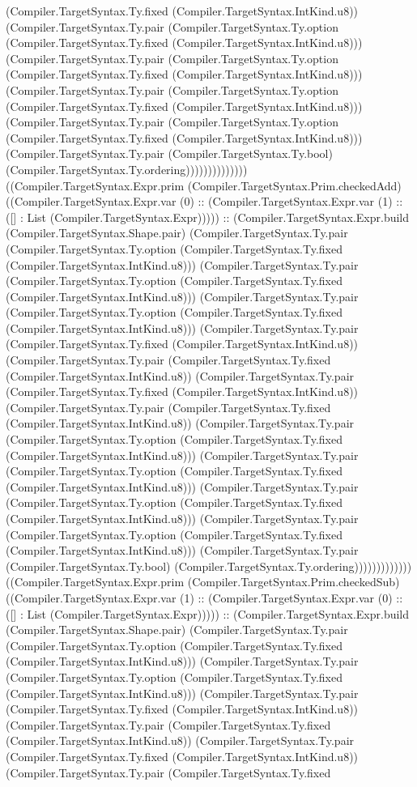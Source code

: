 \documentclass[11pt]{article}
\begin{document}
(Compiler.TargetSyntax.Ty.fixed (Compiler.TargetSyntax.IntKind.u8)) (Compiler.TargetSyntax.Ty.pair (Compiler.TargetSyntax.Ty.option (Compiler.TargetSyntax.Ty.fixed (Compiler.TargetSyntax.IntKind.u8))) (Compiler.TargetSyntax.Ty.pair (Compiler.TargetSyntax.Ty.option (Compiler.TargetSyntax.Ty.fixed (Compiler.TargetSyntax.IntKind.u8))) (Compiler.TargetSyntax.Ty.pair (Compiler.TargetSyntax.Ty.option (Compiler.TargetSyntax.Ty.fixed (Compiler.TargetSyntax.IntKind.u8))) (Compiler.TargetSyntax.Ty.pair (Compiler.TargetSyntax.Ty.option (Compiler.TargetSyntax.Ty.fixed (Compiler.TargetSyntax.IntKind.u8))) (Compiler.TargetSyntax.Ty.pair (Compiler.TargetSyntax.Ty.bool) (Compiler.TargetSyntax.Ty.ordering)))))))))))))) ((Compiler.TargetSyntax.Expr.prim (Compiler.TargetSyntax.Prim.checkedAdd) ((Compiler.TargetSyntax.Expr.var (0) :: (Compiler.TargetSyntax.Expr.var (1) :: ([] : List (Compiler.TargetSyntax.Expr))))) :: (Compiler.TargetSyntax.Expr.build (Compiler.TargetSyntax.Shape.pair) (Compiler.TargetSyntax.Ty.pair (Compiler.TargetSyntax.Ty.option (Compiler.TargetSyntax.Ty.fixed (Compiler.TargetSyntax.IntKind.u8))) (Compiler.TargetSyntax.Ty.pair (Compiler.TargetSyntax.Ty.option (Compiler.TargetSyntax.Ty.fixed (Compiler.TargetSyntax.IntKind.u8))) (Compiler.TargetSyntax.Ty.pair (Compiler.TargetSyntax.Ty.option (Compiler.TargetSyntax.Ty.fixed (Compiler.TargetSyntax.IntKind.u8))) (Compiler.TargetSyntax.Ty.pair (Compiler.TargetSyntax.Ty.fixed (Compiler.TargetSyntax.IntKind.u8)) (Compiler.TargetSyntax.Ty.pair (Compiler.TargetSyntax.Ty.fixed (Compiler.TargetSyntax.IntKind.u8)) (Compiler.TargetSyntax.Ty.pair (Compiler.TargetSyntax.Ty.fixed (Compiler.TargetSyntax.IntKind.u8)) (Compiler.TargetSyntax.Ty.pair (Compiler.TargetSyntax.Ty.fixed (Compiler.TargetSyntax.IntKind.u8)) (Compiler.TargetSyntax.Ty.pair (Compiler.TargetSyntax.Ty.option (Compiler.TargetSyntax.Ty.fixed (Compiler.TargetSyntax.IntKind.u8))) (Compiler.TargetSyntax.Ty.pair (Compiler.TargetSyntax.Ty.option (Compiler.TargetSyntax.Ty.fixed (Compiler.TargetSyntax.IntKind.u8))) (Compiler.TargetSyntax.Ty.pair (Compiler.TargetSyntax.Ty.option (Compiler.TargetSyntax.Ty.fixed (Compiler.TargetSyntax.IntKind.u8))) (Compiler.TargetSyntax.Ty.pair (Compiler.TargetSyntax.Ty.option (Compiler.TargetSyntax.Ty.fixed (Compiler.TargetSyntax.IntKind.u8))) (Compiler.TargetSyntax.Ty.pair (Compiler.TargetSyntax.Ty.bool) (Compiler.TargetSyntax.Ty.ordering))))))))))))) ((Compiler.TargetSyntax.Expr.prim (Compiler.TargetSyntax.Prim.checkedSub) ((Compiler.TargetSyntax.Expr.var (1) :: (Compiler.TargetSyntax.Expr.var (0) :: ([] : List (Compiler.TargetSyntax.Expr))))) :: (Compiler.TargetSyntax.Expr.build (Compiler.TargetSyntax.Shape.pair) (Compiler.TargetSyntax.Ty.pair (Compiler.TargetSyntax.Ty.option (Compiler.TargetSyntax.Ty.fixed (Compiler.TargetSyntax.IntKind.u8))) (Compiler.TargetSyntax.Ty.pair (Compiler.TargetSyntax.Ty.option (Compiler.TargetSyntax.Ty.fixed (Compiler.TargetSyntax.IntKind.u8))) (Compiler.TargetSyntax.Ty.pair (Compiler.TargetSyntax.Ty.fixed (Compiler.TargetSyntax.IntKind.u8)) (Compiler.TargetSyntax.Ty.pair (Compiler.TargetSyntax.Ty.fixed (Compiler.TargetSyntax.IntKind.u8)) (Compiler.TargetSyntax.Ty.pair (Compiler.TargetSyntax.Ty.fixed (Compiler.TargetSyntax.IntKind.u8)) (Compiler.TargetSyntax.Ty.pair (Compiler.TargetSyntax.Ty.fixed 
\end{document}
